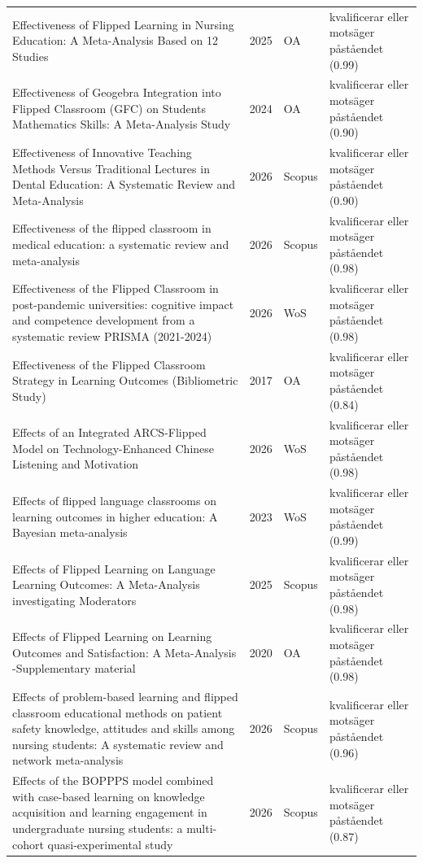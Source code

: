 \begin{longtable}{@{}%
  >{\raggedright\arraybackslash}p{}c%
  >{\raggedright\arraybackslash}p{}%
  >{\raggedright\arraybackslash}p{}@{}}
Effectiveness of Flipped Learning in Nursing Education: A Meta-Analysis Based on 12 Studies & 2025 & OA & kvalificerar eller motsäger påståendet (0.99) \\
Effectiveness of Geogebra Integration into Flipped Classroom (GFC) on Students Mathematics Skills: A Meta-Analysis Study & 2024 & OA & kvalificerar eller motsäger påståendet (0.90) \\
Effectiveness of Innovative Teaching Methods Versus Traditional Lectures in Dental Education: A Systematic Review and Meta-Analysis & 2026 & Scopus & kvalificerar eller motsäger påståendet (0.90) \\
Effectiveness of the flipped classroom in medical education: a systematic review and meta-analysis & 2026 & Scopus & kvalificerar eller motsäger påståendet (0.98) \\
Effectiveness of the Flipped Classroom in post-pandemic universities: cognitive impact and competence development from a systematic review PRISMA (2021-2024) & 2026 & WoS & kvalificerar eller motsäger påståendet (0.98) \\
Effectiveness of the Flipped Classroom Strategy in Learning Outcomes (Bibliometric Study) & 2017 & OA & kvalificerar eller motsäger påståendet (0.84) \\
Effects of an Integrated ARCS-Flipped Model on Technology-Enhanced Chinese Listening and Motivation & 2026 & WoS & kvalificerar eller motsäger påståendet (0.98) \\
Effects of flipped language classrooms on learning outcomes in higher education: A Bayesian meta-analysis & 2023 & WoS & kvalificerar eller motsäger påståendet (0.99) \\
Effects of Flipped Learning on Language Learning Outcomes: A Meta-Analysis investigating Moderators & 2025 & Scopus & kvalificerar eller motsäger påståendet (0.98) \\
Effects of Flipped Learning on Learning Outcomes and Satisfaction: A Meta-Analysis -Supplementary material & 2020 & OA & kvalificerar eller motsäger påståendet (0.98) \\
Effects of problem-based learning and flipped classroom educational methods on patient safety knowledge, attitudes and skills among nursing students: A systematic review and network meta-analysis & 2026 & Scopus & kvalificerar eller motsäger påståendet (0.96) \\
Effects of the BOPPPS model combined with case-based learning on knowledge acquisition and learning engagement in undergraduate nursing students: a multi-cohort quasi-experimental study & 2026 & Scopus & kvalificerar eller motsäger påståendet (0.87) \\

\end{longtable}
